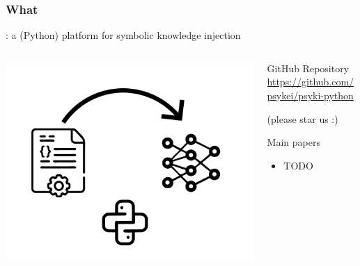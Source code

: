 \documentclass[presentation]{beamer}\mode<presentation>{\usetheme{AMSBolognaFC}}
\begin{document}
\begin{frame}%
    \frametitle{What}

    \alert{\psyki}: a (Python) platform for symbolic knowledge injection

    \begin{columns}
        \begin{column}{.3\linewidth}
            \centering
            \includegraphics[width=\linewidth]{./figures/psyki-logo.pdf}
        \end{column}
        \begin{column}{.7\linewidth}
            \begin{block}{GitHub Repository}\centering
                \alert{\url{https://github.com/psykei/psyki-python}}

                \tiny{(please star us :)}
            \end{block}

            \begin{block}{Main papers}
                \begin{itemize}
                    \item TODO
                \end{itemize}
            \end{block}
        \end{column}
    \end{columns}
\end{frame}

        
\end{document}
